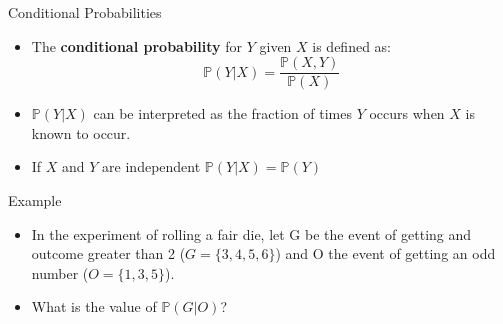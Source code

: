 \documentclass[handout]{beamer}
\begin{document}
\begin{frame}{Conditional Probabilities}
\scriptsize{
\begin{itemize}
\item The \textbf{conditional probability} for $Y$ given $X$ is defined as:
 \begin{displaymath}
  \mathbb{P}(Y|X) = \frac{\mathbb{P}(X,Y)}{\mathbb{P}(X)}
 \end{displaymath}
 \item $\mathbb{P}(Y|X)$ can be interpreted as the fraction of times $Y$ occurs when $X$ is known to occur.
 
   \item  If $X$ and $Y$ are independent $\mathbb{P}(Y|X)=\mathbb{P}(Y)$
 
 
 
 
 
 


\end{itemize}

\begin{block}{Example}
\begin{itemize}

 \item In the experiment of rolling a fair die, let G be the event of getting and outcome greater than 2 ($G=\{3,4,5,6\}$) and O the event of getting an odd number ($O=\{1,3,5\}$).
 
 \item What is the value of $\mathbb{P}(G|O)$?
 
\end{itemize}
 
\end{block}



} 
\end{frame}
\end{document}
